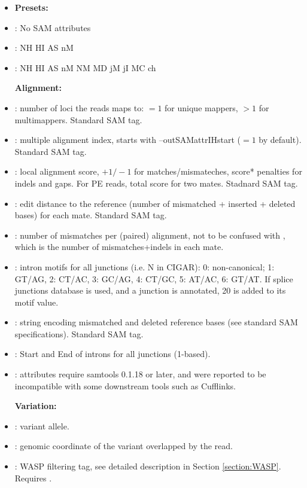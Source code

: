 \documentclass[12pt]{article}
\begin{document}
\begin{itemize}[itemsep=1pt]
\item[]	
\textbf{Presets:}
%
\item[]
 : No SAM attributes
%
\item[]
 : NH HI AS nM
%
\item[]
 : NH HI AS nM NM MD jM jI MC ch 	

\textbf{Alignment:}
%
\item[]
 : number of loci the reads maps to: $=1$ for unique mappers, $>1$ for multimappers. Standard SAM tag.
%
\item[]
  : multiple alignment index, starts with --outSAMattrIHstart ($=1$ by default). Standard SAM tag.
%
\item[]
 : local alignment score, $+1/-1$ for matches/mismateches, score* penalties for indels and gaps. For PE reads, total score for two mates. Stadnard SAM tag.
%
\item[]
 : edit distance to the reference (number of mismatched + inserted + deleted bases) for each mate. Standard SAM tag.
%
\item[]
 : number of mismatches per (paired) alignment, not to be confused with , which is the number of mismatches+indels in each mate.
%
\item[]
 : intron motifs for all junctions (i.e. N in CIGAR): 0: non-canonical; 1: GT/AG, 2: CT/AC, 3: GC/AG, 4: CT/GC, 5: AT/AC, 6: GT/AT. If splice junctions database is used, and a junction is annotated, 20 is added to its motif value.
%
\item[]
 : string encoding mismatched and deleted reference bases (see standard SAM specifications). Standard SAM tag.
%
\item[]
 : Start and End of introns for all junctions (1-based).
%
\item[]
 : attributes require samtools 0.1.18 or later, and were reported to be incompatible with some downstream tools such as Cufflinks.

\textbf{Variation:}
%
\item[]
 : variant allele.
%
\item[]
 : genomic coordinate of the variant overlapped by the read.
%
\item[]
 : WASP filtering tag, see detailed description in Section \ref{section:WASP}. Requires  .


\end{itemize}
\end{document}

